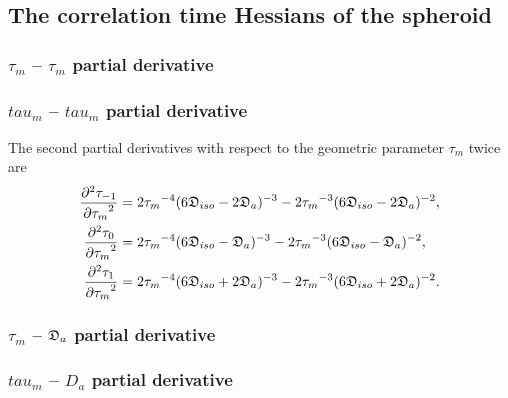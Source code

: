 
\subsection{The correlation time Hessians of the spheroid}


\begin{latexonly}
    \subsubsection{$\tau_m$ -- $\tau_m$ partial derivative}
\end{latexonly}
\begin{htmlonly}
    \subsubsection{$tau_m$ -- $tau_m$ partial derivative}
\end{htmlonly}

The second partial derivatives with respect to the geometric parameter $\tau_m$ twice are
\begin{subequations}
\begin{align}
    \frac{\partial^2 \tau_{-1}}{{\partial \tau_m}^2} &= 2{\tau_m}^{-4} (6\mathfrak{D}_{iso} - 2\mathfrak{D}_a)^{-3}
        - 2{\tau_m}^{-3} (6\mathfrak{D}_{iso} - 2\mathfrak{D}_a)^{-2}, \\
    \frac{\partial^2 \tau_{0}}{{\partial \tau_m}^2}  &= 2{\tau_m}^{-4} (6\mathfrak{D}_{iso} - \mathfrak{D}_a)^{-3}
        - 2{\tau_m}^{-3} (6\mathfrak{D}_{iso} - \mathfrak{D}_a)^{-2}, \\
    \frac{\partial^2 \tau_{1}}{{\partial \tau_m}^2}  &= 2{\tau_m}^{-4} (6\mathfrak{D}_{iso} + 2\mathfrak{D}_a)^{-3}
        - 2{\tau_m}^{-3} (6\mathfrak{D}_{iso} + 2\mathfrak{D}_a)^{-2}.
\end{align}
\end{subequations}



\begin{latexonly}
    \subsubsection{$\tau_m$ -- $\mathfrak{D}_a$ partial derivative}
\end{latexonly}
\begin{htmlonly}
    \subsubsection{$tau_m$ -- $D_a$ partial derivative}
\end{htmlonly}

